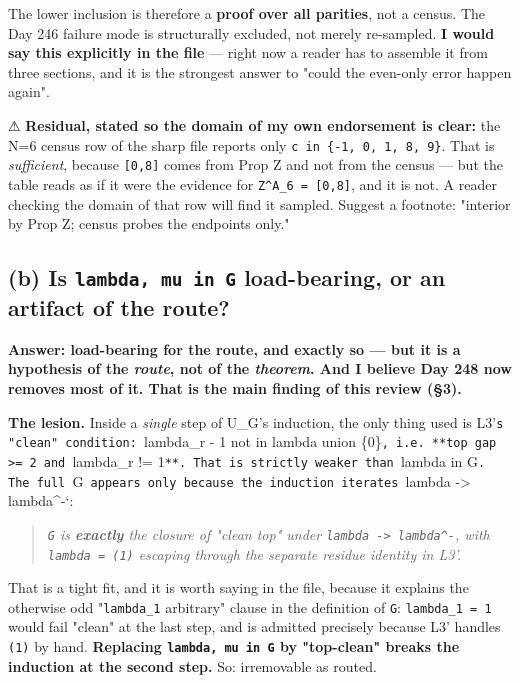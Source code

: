 \documentclass[11pt,a4paper]{article}
\begin{document}
The lower inclusion is therefore a \textbf{proof over all parities}, not a census. The Day 246 failure mode is structurally excluded, not merely re-sampled. \textbf{I would say this explicitly in the file} --- right now a reader has to assemble it from three sections, and it is the strongest answer to "could the even-only error happen again".

⚠ \textbf{Residual, stated so the domain of my own endorsement is clear:} the N=6 census row of the sharp file reports only \mbox{\texttt{c in \{-1, 0, 1, 8, 9\}}}. That is \emph{sufficient}, because \mbox{\texttt{[0,8]}} comes from Prop Z and not from the census --- but the table reads as if it were the evidence for \mbox{\texttt{Z\textasciicircum{}A\_6 = [0,8]}}, and it is not. A reader checking the domain of that row will find it sampled. Suggest a footnote: "interior by Prop Z; census probes the endpoints only."

\subsection*{(b) Is \mbox{\texttt{lambda, mu in G}} load-bearing, or an artifact of the route?}

\textbf{Answer: load-bearing for the route, and exactly so --- but it is a hypothesis of the \emph{route}, not of the \emph{theorem}. And I believe Day 248 now removes most of it. That is the main finding of this review (\S{}3).}

\textbf{The lesion.} Inside a \emph{single} step of U\_G's induction, the only thing used is L3'\mbox{\texttt{s "clean" condition: }}lambda\_r - 1 not in lambda union \{0\}\mbox{\texttt{, i.e. **top gap >= 2 and }}lambda\_r != 1\mbox{\texttt{**. That is strictly weaker than }}lambda in G\mbox{\texttt{. The full }}G\mbox{\texttt{ appears only because the induction iterates }}lambda -> lambda\textasciicircum{}-`:

\begin{quote}\itshape \mbox{\texttt{G}} is \textbf{exactly} the closure of "clean top" under \mbox{\texttt{lambda -> lambda\textasciicircum{}-}}, with \mbox{\texttt{lambda = (1)}} escaping through the separate residue identity in L3'.\end{quote}

That is a tight fit, and it is worth saying in the file, because it explains the otherwise odd "\mbox{\texttt{lambda\_1}} arbitrary" clause in the definition of \mbox{\texttt{G}}: \mbox{\texttt{lambda\_1 = 1}} would fail "clean" at the last step, and is admitted precisely because L3' handles \mbox{\texttt{(1)}} by hand. \textbf{Replacing \mbox{\texttt{lambda, mu in G}} by "top-clean" breaks the induction at the second step.} So: irremovable as routed.
\end{document}
